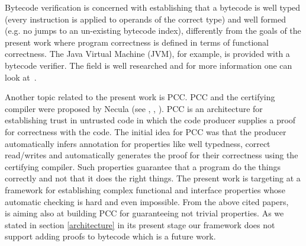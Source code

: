  Bytecode verification is concerned with establishing that a bytecode is well typed 
(every instruction is applied to operands of the correct type) and well formed 
(e.g. no jumps to an un-existing bytecode index), differently from the goals of the present
work where program correctness is defined in terms of functional correctness. The Java Virtual Machine (JVM), for example, is provided with a bytecode verifier. 
The field is well researched and for more information one can look at~\cite{Ljbc}.  

Another topic related to the present work is PCC.
 PCC and the certifying compiler were proposed by Necula (see \cite{Necula97}, \cite{ComNec}, \cite{DesNecLee98}). PCC is an architecture for establishing trust in untrusted code 
in which the code producer supplies a proof for correctness with the code. 
The initial idea for PCC  was that the producer automatically infers annotation for properties like well typedness, 
correct read/writes and automatically generates the proof for their correctness using the certifying compiler. 
Such properties guarantee that a program do the things correctly and not that it does the right things. The present work is targeting at a
 framework for establishing complex functional and interface properties whose automatic checking is hard and even impossible. 
 From the above cited papers, ~\cite{BM05plb} is aiming also at building PCC for
 guaranteeing not trivial properties. As we stated in section \ref{architecture} in its present stage our framework does not support adding proofs to bytecode 
 which is a future work. 
 
